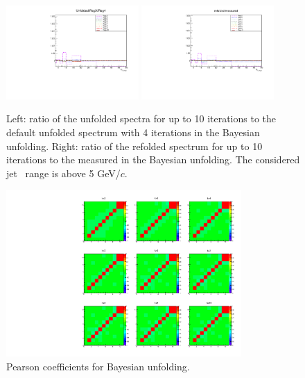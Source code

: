 \begin{figure}[bth]
\centering
\includegraphics[width=0.45\textwidth]{pPbcuts_2sig/unfoldedSpectrum_unfRatio}
\includegraphics[width=0.45\textwidth]{pPbcuts_2sig/unfoldedSpectrum_foldedRatio}
\caption{Left: ratio of the unfolded spectra for up to 10 iterations to the default unfolded spectrum with 4 iterations in the Bayesian unfolding. Right: ratio of the refolded spectrum for up to 10 iterations to the measured in the Bayesian unfolding. The considered jet \pt\ range is above 5 GeV/$c$.}
\label{fig:unfIterations_pPb_Dzero}
\end{figure}

\begin{figure}[bth]
\centering
\includegraphics[width=0.8\textwidth]{pPbcuts_2sig/unfoldedSpectrum_Pearson}
\caption{Pearson coefficients for Bayesian unfolding.}
\label{fig:unfPearsonCoeff_pp_Dzero}
\end{figure}

